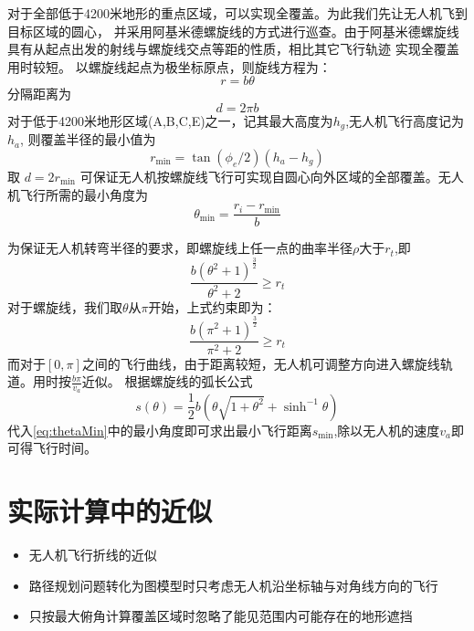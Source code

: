 对于全部低于4200米地形的重点区域，可以实现全覆盖。为此我们先让无人机飞到目标区域的圆心，
并采用阿基米德螺旋线的方式进行巡查。由于阿基米德螺旋线具有从起点出发的射线与螺旋线交点等距的性质，相比其它飞行轨迹
实现全覆盖用时较短。
以螺旋线起点为极坐标原点，则旋线方程为：
\begin{equation}
r=b\theta
\end{equation}
分隔距离为
\begin{equation}
d=2\pi b
\end{equation}
对于低于4200米地形区域(A,B,C,E)之一，记其最大高度为$h_g$,无人机飞行高度记为$h_a$, 则覆盖半径的最小值为
\begin{equation}
r_{\text{min}}=\tan(\phi_e/2)(h_a-h_g)
\end{equation}
取 $d=2r_{\text{min}}$ 可保证无人机按螺旋线飞行可实现自圆心向外区域的全部覆盖。无人机飞行所需的最小角度为
\begin{equation}\label{eq:thetaMin}
\theta_{\text{min}}=\frac{r_i-r_{\text{min}}}{b}
\end{equation}

为保证无人机转弯半径的要求，即螺旋线上任一点的曲率半径$\rho$大于$r_t$,即
\begin{equation}
\frac{b(\theta^2+1)^{\frac{3}{2}}}{\theta^2+2}\geq r_t
\end{equation}
对于螺旋线，我们取$\theta$从$\pi$开始，上式约束即为：
\begin{equation}
\frac{b(\pi^2+1)^{\frac{3}{2}}}{\pi^2+2}\geq r_t
\end{equation}
而对于$[0,\pi]$之间的飞行曲线，由于距离较短，无人机可调整方向进入螺旋线轨道。用时按$\frac{b\pi}{v_a}$近似。
根据螺旋线的弧长公式
\begin{equation}
s(\theta)=\frac{1}{2}b(\theta\sqrt{1+\theta^2}+\sinh^{-1}\theta)
\end{equation}
代入\eqref{eq:thetaMin}中的最小角度即可求出最小飞行距离$s_{\text{min}}$,除以无人机的速度$v_a$即可得飞行时间。
\section{实际计算中的近似}
\begin{itemize}
\item 无人机飞行折线的近似
\item 路径规划问题转化为图模型时只考虑无人机沿坐标轴与对角线方向的飞行
\item 只按最大俯角计算覆盖区域时忽略了能见范围内可能存在的地形遮挡
\end{itemize}
